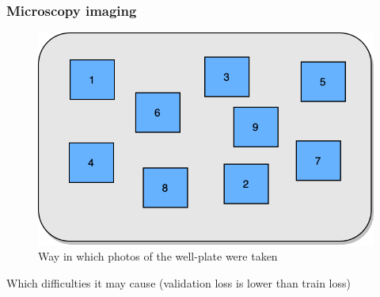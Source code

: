         \subsubsection{Microscopy imaging}
            \begin{figure}[htb]
                \begin{center}
                    \includegraphics[width=0.5\linewidth]{bilder/dic-random.png}
                    \caption{Way in which photos of the well-plate were taken}\label{fig:random-dic}
                \end{center}
            \end{figure}    
            Which difficulties it may cause (validation loss is lower than train loss)